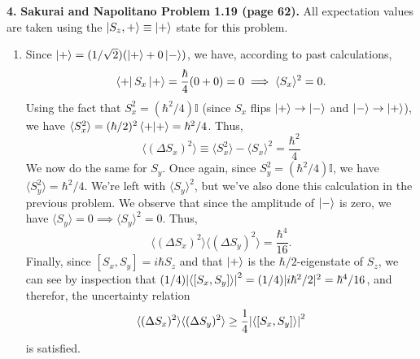 \documentclass{article}
\theoremstyle{definition}
\newcommand{\f}[2]{\frac{#1}{#2}}
\begin{document}
\noindent \textbf{4.} \textbf{Sakurai and Napolitano Problem 1.19 (page 62).} All expectation values are taken using the $\ket{S_z, +} \equiv \ket{+}$ state for this problem.


\begin{enumerate}[label=(\alph*)]
	\item Since $\ket{+} = (1/\sqrt{2})(\ket{+} + 0 \ket{-})$, we have, according to past calculations,
	\begin{equation*}
	\bra{+} S_x \ket{+} = \f{\hbar}{4}(0+0) = 0 \implies \langle S_x \rangle^2 = 0.
	\end{equation*}
	Using the fact that $S_x^2 = (\hbar^2/4)\mathbb{I}$ (since $S_x$ flips $\ket{+}\to \ket{-}$ and $\ket{-} \to \ket{+}$), we have $\langle S_x^2 \rangle = (\hbar/2)^2 \braket{+} = \hbar^2/4$. Thus,
	\begin{equation*}
	\langle (\Delta S_x)^2\rangle \equiv \langle S_x^2\rangle - \langle S_x \rangle^2 = \boxed{\f{\hbar^2}{4}}
	\end{equation*}
	We now do the same for $S_y$. Once again, since $S_y^2 = (\hbar^2/4)\mathbb{I}$, we have $\langle S_y^2 \rangle = \hbar^2/4$. We're left with $\langle S_y \rangle^2$, but we've also done this calculation in the previous problem. We observe that since the amplitude of $\ket{-}$ is zero, we have $\langle S_y \rangle = 0 \implies \langle S_y \rangle^2 = 0$. Thus, 
	\begin{equation*}
	\langle (\Delta S_x)^2\rangle \langle (\Delta S_y)^2\rangle = {\f{\hbar^4}{16}}.
	\end{equation*}
	Finally, since $[S_x, S_y] = i\hbar S_z$ and that $\ket{+}$ is the $\hbar/2$-eigenstate of $S_z$, we can see by inspection that $(1/4)\abs{\langle [S_x, S_y] \rangle}^2 = (1/4)|i\hbar^2/2|^2 = \hbar^4/16$, and therefor, the uncertainty relation 
	\begin{equation*}
	\langle (\Delta S_x)^2\rangle \langle (\Delta S_y)^2\rangle \geq  \f{1}{4}\abs{\langle [S_x, S_y] \rangle}^2
	\end{equation*}
	is satisfied. 
	
	
	

\end{enumerate}
\end{document}
